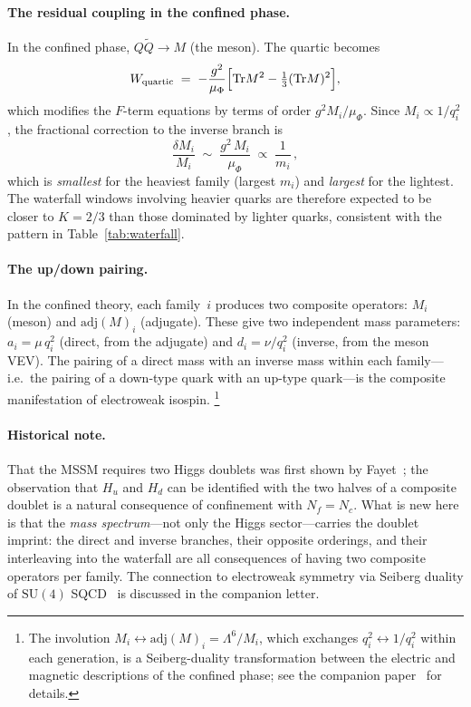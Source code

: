 \documentclass[preprint,12pt]{elsarticle}
\newcommand{\SU}{\mathrm{SU}}
\newcommand{\Nf}{N_{\!f}}
\newcommand{\Nc}{N_{\!c}}
\newcommand{\Tr}{\mathrm{Tr}}
\newcommand{\adj}{\mathrm{adj}}
\begin{document}
\paragraph{The residual coupling in the confined phase.}
In the confined phase, $Q\tilde{Q} \to M$ (the meson).
The quartic becomes
\begin{equation}
  W_{\rm quartic} \;=\;
  -\frac{g^2}{\mu_\Phi}\Bigl[\Tr M^2
  - \tfrac{1}{3}(\Tr M)^2\Bigr],
  \label{eq:quartic}
\end{equation}
which modifies the $F$-term equations by terms
of order $g^2 M_i/\mu_\Phi$.  Since $M_i \propto 1/q_i^2$,
the fractional correction to the inverse branch is
\begin{equation}
  \frac{\delta M_i}{M_i}
  \;\sim\; \frac{g^2\,M_i}{\mu_\Phi}
  \;\propto\; \frac{1}{m_i}\,,
  \label{eq:correction}
\end{equation}
which is \emph{smallest} for the heaviest family
(largest $m_i$) and \emph{largest} for the lightest.
The waterfall windows involving heavier quarks are
therefore expected to be closer to $K = 2/3$ than
those dominated by lighter quarks, consistent with the
pattern in Table~\ref{tab:waterfall}.

\paragraph{The up/down pairing.}
In the confined theory, each family~$i$ produces two
composite operators: $M_i$ (meson) and $\adj(M)_i$
(adjugate).  These give two independent mass parameters:
$a_i = \mu\,q_i^2$ (direct, from the adjugate) and
$d_i = \nu/q_i^2$ (inverse, from the meson VEV).
The pairing of a direct mass with an inverse mass
within each family---i.e.\ the pairing of a
down-type quark with an up-type quark---is the
composite manifestation of electroweak isospin.%
\footnote{The involution
$M_i \leftrightarrow \adj(M)_i = \Lambda^6/M_i$,
which exchanges $q_i^2 \leftrightarrow 1/q_i^2$
within each generation, is a Seiberg-duality
transformation between the electric and magnetic
descriptions of the confined phase;
see the companion paper~\cite{letter_q2} for details.}

\paragraph{Historical note.}
That the MSSM requires two Higgs doublets was
first shown by Fayet~\cite{Fayet:1976,Fayet:1977};
the observation that $H_u$ and $H_d$ can be identified
with the two halves of a composite doublet is a natural
consequence of confinement with $\Nf = \Nc$.
What is new here is that the \emph{mass spectrum}---not
only the Higgs sector---carries the doublet imprint:
the direct and inverse branches, their opposite orderings,
and their interleaving into the waterfall are all consequences
of having two composite operators per family.
The connection to electroweak symmetry via Seiberg
duality of $\SU(4)$ SQCD~\cite{CST:2011} is discussed
in the companion letter.
\end{document}
